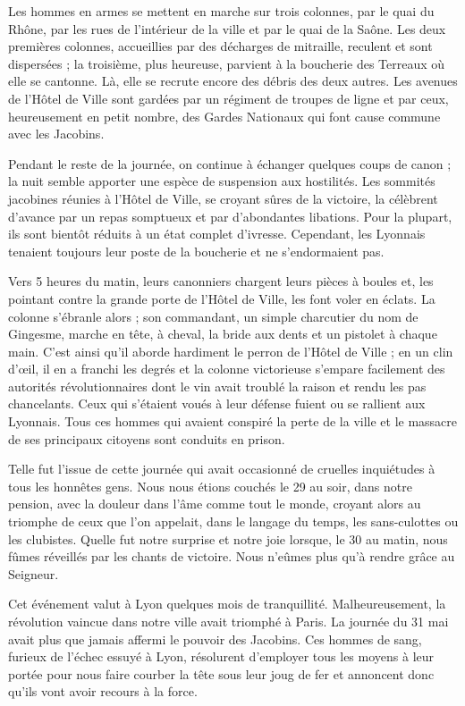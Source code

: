 \documentclass[11pt,a4paper]{report}
\begin{document}
Les hommes en armes se mettent en marche sur trois colonnes, par le quai du Rhône, par les rues de l'intérieur de la ville et par le quai de la Saône. Les deux premières colonnes, accueillies par des décharges de mitraille, reculent et sont dispersées ; la troisième, plus heureuse, parvient à la boucherie des Terreaux où elle se cantonne. Là, elle se recrute encore des débris des deux autres. Les avenues de l'Hôtel de Ville sont gardées par un régiment de troupes de ligne et par ceux, heureusement en petit nombre, des Gardes Nationaux qui font cause commune avec les Jacobins.

Pendant le reste de la journée, on continue à échanger quelques coups de canon ; la nuit semble apporter une espèce de suspension aux hostilités. Les sommités jacobines réunies à l'Hôtel de Ville, se croyant sûres de la victoire, la célèbrent d'avance par un repas somptueux et par d'abondantes libations. Pour la plupart, ils sont bientôt réduits à un état complet d'ivresse. Cependant, les Lyonnais tenaient toujours leur poste de la boucherie et ne s'endormaient pas.

Vers 5 heures du matin, leurs canonniers chargent leurs pièces à boules et, les pointant contre la grande porte de l'Hôtel de Ville, les font voler en éclats. La colonne s'ébranle alors ; son commandant, un simple charcutier du nom de Gingesme, marche en tête, à cheval, la bride aux dents et un pistolet à chaque main. C'est ainsi qu'il aborde hardiment le perron de l'Hôtel de Ville ; en un clin d'œil, il en a franchi les degrés et la colonne victorieuse s'empare facilement des autorités révolutionnaires dont le vin avait troublé la raison et rendu les pas chancelants. Ceux qui s'étaient voués à leur défense fuient ou se rallient aux Lyonnais. Tous ces hommes qui avaient conspiré la perte de la ville et le massacre de ses principaux citoyens sont conduits en prison.

Telle fut l'issue de cette journée qui avait occasionné de cruelles inquiétudes à tous les honnêtes gens. Nous nous étions couchés le 29 au soir, dans notre pension, avec la douleur dans l'âme comme tout le monde, croyant alors au triomphe de ceux que l'on appelait, dans le langage du temps, les sans-culottes ou les clubistes. Quelle fut notre surprise et notre joie lorsque, le 30 au matin, nous fûmes réveillés par les chants de victoire. Nous n'eûmes plus qu'à rendre grâce au Seigneur.

Cet événement valut à Lyon quelques mois de tranquillité. Malheureusement, la révolution vaincue dans notre ville avait triomphé à Paris. La journée du 31 mai avait plus que jamais affermi le pouvoir des Jacobins. Ces hommes de sang, furieux de l'échec essuyé à Lyon, résolurent d'employer tous les moyens à leur portée pour nous faire courber la tête sous leur joug de fer et annoncent donc qu'ils vont avoir recours à la force.
\end{document}
